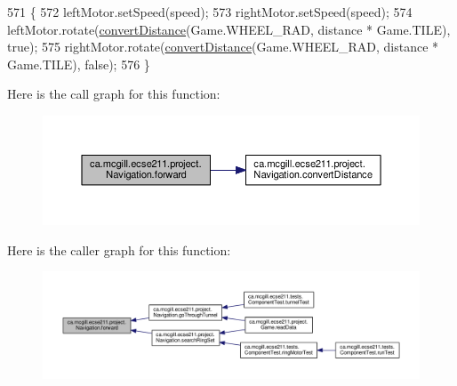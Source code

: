 \begin{DoxyCode}
571                                                   \{
572     leftMotor.setSpeed(speed);
573     rightMotor.setSpeed(speed);
574     leftMotor.rotate(\hyperlink{classca_1_1mcgill_1_1ecse211_1_1project_1_1_navigation_ac9e260bcd619ffa4820d7d0de7ea1c12}{convertDistance}(Game.WHEEL\_RAD, distance * Game.TILE), \textcolor{keyword}{true});
575     rightMotor.rotate(\hyperlink{classca_1_1mcgill_1_1ecse211_1_1project_1_1_navigation_ac9e260bcd619ffa4820d7d0de7ea1c12}{convertDistance}(Game.WHEEL\_RAD, distance * Game.TILE), \textcolor{keyword}{false});
576   \}
\end{DoxyCode}
Here is the call graph for this function\+:
\nopagebreak
\begin{figure}[H]
\begin{center}
\leavevmode
\includegraphics[width=350pt]{classca_1_1mcgill_1_1ecse211_1_1project_1_1_navigation_a7c66610c5b7496ddb35d342ab2cd3f08_cgraph}
\end{center}
\end{figure}
Here is the caller graph for this function\+:
\nopagebreak
\begin{figure}[H]
\begin{center}
\leavevmode
\includegraphics[width=350pt]{classca_1_1mcgill_1_1ecse211_1_1project_1_1_navigation_a7c66610c5b7496ddb35d342ab2cd3f08_icgraph}
\end{center}
\end{figure}
\mbox{\label{classca_1_1mcgill_1_1ecse211_1_1project_1_1_navigation_a4b52e605d3ea2f9bcd9481ae2c69ba39}} 
